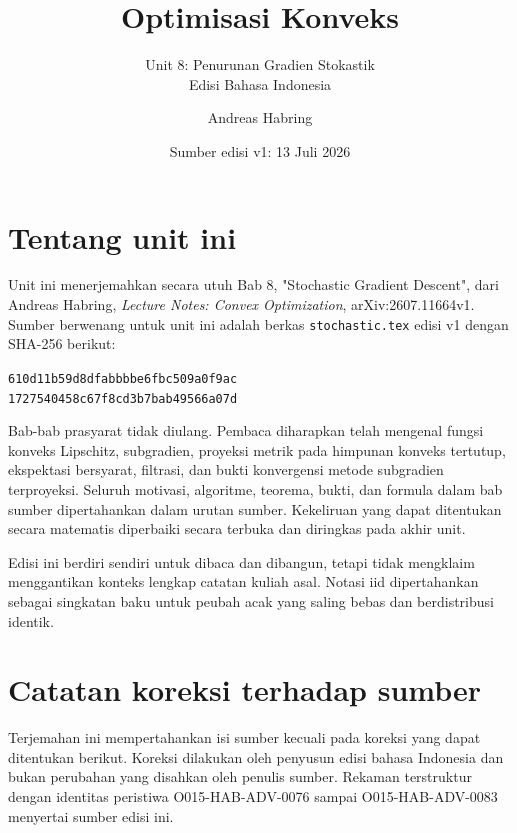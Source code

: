 \documentclass[indonesian]{shinybook}
\title{Optimisasi Konveks}
\subtitle{Unit 8: Penurunan Gradien Stokastik\\Edisi Bahasa Indonesia}
\author{Andreas Habring}
\date{Sumber edisi v1: 13 Juli 2026}
\begin{document}
\maketitle

\frontmatter
\chapter*{Tentang unit ini}
Unit ini menerjemahkan secara utuh Bab 8, "Stochastic Gradient Descent", dari Andreas Habring, \emph{Lecture Notes: Convex Optimization}, arXiv:2607.11664v1. Sumber berwenang untuk unit ini adalah berkas \texttt{stochastic.tex} edisi v1 dengan SHA-256 berikut:
\begin{center}
\small\texttt{610d11b59d8dfabbbbe6fbc509a0f9ac}\\[-0.2em]
\texttt{1727540458c67f8cd3b7bab49566a07d}
\end{center}

Bab-bab prasyarat tidak diulang. Pembaca diharapkan telah mengenal fungsi konveks Lipschitz, subgradien, proyeksi metrik pada himpunan konveks tertutup, ekspektasi bersyarat, filtrasi, dan bukti konvergensi metode subgradien terproyeksi. Seluruh motivasi, algoritme, teorema, bukti, dan formula dalam bab sumber dipertahankan dalam urutan sumber. Kekeliruan yang dapat ditentukan secara matematis diperbaiki secara terbuka dan diringkas pada akhir unit.

Edisi ini berdiri sendiri untuk dibaca dan dibangun, tetapi tidak mengklaim menggantikan konteks lengkap catatan kuliah asal. Notasi iid dipertahankan sebagai singkatan baku untuk peubah acak yang saling bebas dan berdistribusi identik.

\tableofcontents
\mainmatter
\setcounter{chapter}{7}


\backmatter
\chapter*{Catatan koreksi terhadap sumber}
Terjemahan ini mempertahankan isi sumber kecuali pada koreksi yang dapat ditentukan berikut. Koreksi dilakukan oleh penyusun edisi bahasa Indonesia dan bukan perubahan yang disahkan oleh penulis sumber. Rekaman terstruktur dengan identitas peristiwa O015-HAB-ADV-0076 sampai O015-HAB-ADV-0083 menyertai sumber edisi ini.
\end{document}
